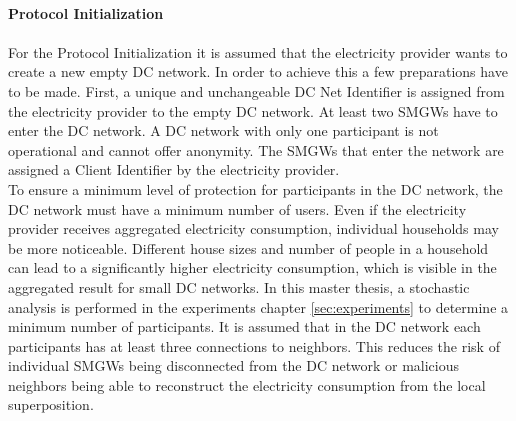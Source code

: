 \\
\textbf{Protocol Initialization}
\\
\\
For the Protocol Initialization it is assumed that the electricity provider wants to create a new empty DC network. In order to achieve this a few preparations have to be made. First, a unique and unchangeable DC Net Identifier is assigned from the electricity provider to the empty DC network. At least two \gls{SMGW}s have to enter the DC network. A DC network with only one participant is not operational and cannot offer anonymity. 
The \gls{SMGW}s that enter the network are assigned a Client Identifier by the electricity provider.\\
To ensure a minimum level of protection for participants in the DC network, the DC network must have a minimum number of users. Even if the electricity provider receives aggregated electricity consumption, individual households may be more noticeable. Different house sizes and number of people in a household can lead to a significantly higher electricity consumption, which is visible in the aggregated result for small DC networks. In this master thesis, a stochastic analysis is performed in the experiments chapter \ref{sec:experiments} to determine a minimum number of participants. It is assumed that in the DC network each participants has at least three connections to neighbors. This reduces the risk of individual \gls{SMGW}s being disconnected from the DC network or malicious neighbors being able to reconstruct the electricity consumption from the local superposition.\\
